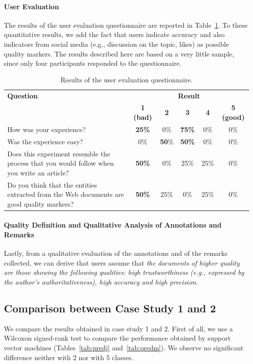 \documentclass{llncs}
\begin{document}
\paragraph{User Evaluation}
The results of the user evaluation questionnaire are reported in Table~\ref{tab:questm}. To these quantitative results, we add the fact that users indicate accuracy and also indicators from social media (e.g., discussion on the topic, likes) as possible quality markers. The results described here are based on a very little sample, since only four participants responded to the questionnaire.
\begin{table}
\centering
\caption{Results of the user evaluation questionnaire.\label{tab:questm}}
\begin{tabular}{|p{6.2cm}|c|c|c|c|c|}
\hline
{\bf Question} & \multicolumn{5}{c|}{\bf Result} \\ \cline{2-6}
& {\bf 1 (bad)} & {\bf 2} & {\bf 3} & {\bf 4} & {\bf 5 (good)} \\ \hline
How was your experience? & {\bf 25\%} & 0\% & {\bf 75\%} & 0\% & 0\%\\ \hline
Was the experience easy? & 0\% & {\bf 50}\% & {\bf 50\%} & 0\% & 0\% \\ \hline
Does this experiment resemble the process that you would follow when you write an article? & {\bf 50\%} & 0\% & 25\% & 25\% & 0\% \\ \hline
Do you think that the entities extracted from the Web documents are good quality markers? & {\bf 50\%} & 25\% & 0\% & 25\% &  0\% \\ \hline
\end{tabular}


\end{table}

\paragraph{Quality Definition and Qualitative Analysis of Annotations and Remarks}
Lastly, from a qualitative evaluation of the annotations and of the remarks collected, we can derive that users assume that \emph{the documents of higher quality are those showing the following qualities: high trustworthiness (e.g., expressed by the author's authoritativeness), high accuracy and high precision}.

\subsection{Comparison between Case Study 1 and 2}
We compare the results obtained in case study 1 and 2.
First of all, we use a Wilcoxon signed-rank test to compare the performance obtained by support vector machines (Tables~\ref{tab:predj} and~\ref{tab:predm}). We observe no significant difference neither with 2 nor with 5 classes.
\end{document}
